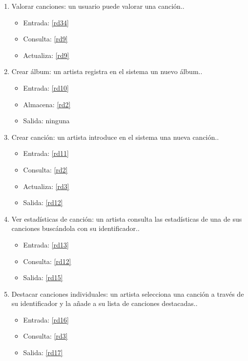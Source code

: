 \documentclass[12pt,a4paper]{article}
\begin{document}
\begin{enumerate}[label=\textnormal{RF\arabic*.}]
	 \item Valorar canciones: un usuario puede valorar una canción.\label{rf6}.
    	\begin{itemize}
			\item Entrada: \ref{rd34}
			\item Consulta: \ref{rd9}
			\item Actualiza: \ref{rd9}
		\end{itemize}
		
		
	 \item Crear álbum: un artista registra en el sistema un nuevo álbum.\label{rf7}.
    	\begin{itemize}
			\item Entrada: \ref{rd10}
			\item Almacena: \ref{rd2}
			\item Salida: ninguna
		\end{itemize}
		
	 \item Crear canción: un artista introduce en el sistema una nueva canción.\label{rf8}.
    	\begin{itemize}
			\item Entrada: \ref{rd11}
			\item Consulta: \ref{rd2}
			\item Actualiza: \ref{rd3}
			\item Salida: \ref{rd12} 
		\end{itemize}
		
	 \item Ver estadísticas de canción: un artista consulta las estadísticas de una de sus canciones buscándola con su identificador.\label{rf9}.
    	\begin{itemize}
			\item Entrada: \ref{rd13}
			\item Consulta: \ref{rd12}
			\item Salida: \ref{rd15}
		\end{itemize}
		
	 \item Destacar canciones individuales: un artista selecciona una canción a través de su identificador y la añade a su lista de canciones destacadas.\label{rf10}.
    	\begin{itemize}
			\item Entrada: \ref{rd16}
			\item Consulta: \ref{rd3}
			\item Salida: \ref{rd17}
		\end{itemize}
		

\end{enumerate}
\end{document}
